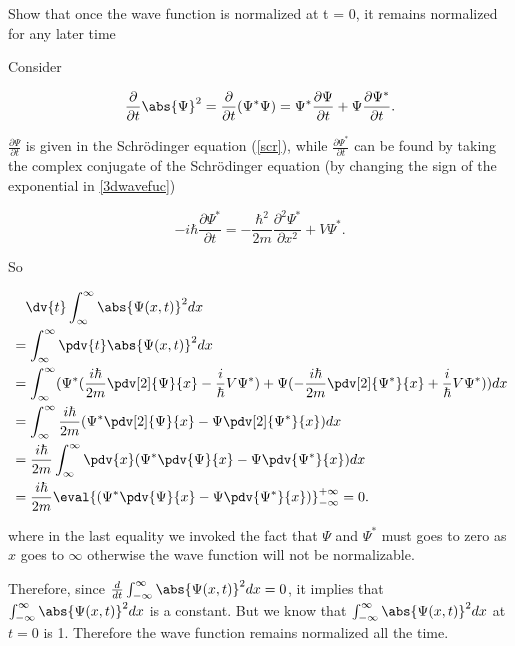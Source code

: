 \documentclass[a4paper,12pt]{report}
\begin{document}
{Show that once the wave function is normalized at t = 0, it remains normalized for any later time}
{Consider

\begin{equation}
  \frac{\partial }{\partial t} \abs{\Psi }^2 = \frac{\partial }{\partial t} (\Psi^*\Psi ) = \Psi ^* \frac{\partial \Psi }{\partial t} + \Psi \frac{\partial \Psi ^*}{\partial t}.   
\end{equation}

\(\frac{\partial \Psi }{\partial t} \) is given in the Schrödinger equation (\cref{scr}), while \(\frac{\partial \Psi ^*}{\partial t} \) can be found by taking the complex conjugate of the Schrödinger equation (by changing the sign of the exponential in \cref{3dwavefuc})
		
\begin{equation}
  -i \hbar \frac{\partial \Psi^*}{\partial t}=-\frac{\hbar^2}{2 m} \frac{\partial^2 \Psi^*}{\partial x^2}+V\Psi^*.
\end{equation}
		
So
		
\begin{equation}
  \begin{aligned}
    &~~~\dv{t} \int_{\infty}^{\infty}   \abs{\Psi(x,t)}^2 dx \\ &= \int_{\infty}^{\infty}   \pdv{t} \abs{\Psi(x,t)}^2 dx \\ &= \int_{\infty}^{\infty}   (\Psi^*(\frac{i\hbar}{2m}\pdv[2]{\Psi}{x} - \frac{i}{\hbar}V\Psi^*) + \Psi(-\frac{i\hbar}{2m}\pdv[2]{\Psi^*}{x} + \frac{i}{\hbar}V\Psi^*))dx \\ &= \int_{\infty}^{\infty}   \frac{i\hbar}{2m}(\Psi^*\pdv[2]{\Psi}{x} - \Psi\pdv[2]{\Psi^*}{x})dx \\ &= \frac{i\hbar}{2m}\int_{\infty}^{\infty}  \pdv{x}(\Psi^*\pdv{\Psi}{x} - \Psi\pdv{\Psi^*}{x})dx \\ &= \frac{i\hbar}{2m} \eval{(\Psi^*\pdv{\Psi}{x} - \Psi\pdv{\Psi^*}{x})}_{-\infty}^{+\infty} = 0. \label{ddtpsi2}
  \end{aligned}
\end{equation}

where in the last equality we invoked the fact that \(\Psi\) and \(\Psi^*\) must goes to zero as \(x\) goes to \(\infty\) otherwise the wave function will not be normalizable.
		
Therefore, since \(\frac{ d}{ dt} \int_{-\infty}^{\infty} \abs{\Psi (x,t)}^2 dx = 0\), it implies that \(\int_{-\infty}^{\infty}   \abs{\Psi(x,t)}^2 dx\) is a constant. But we know that \(\int_{-\infty}^{\infty}   \abs{\Psi(x,t)}^2 dx\) at \(t = 0\) is 1. Therefore the wave function remains normalized all the time.}		
		
\end{document}
